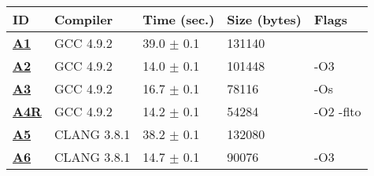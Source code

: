     \begin{tabular}{|l|l|l|l|p{3.2in}|}
     \hline
      \textbf{ID} & \textbf{Compiler} & \textbf{Time (sec.)} & \textbf{Size (bytes)} & \textbf{Flags} \\ 
     \hline
      \textbf{ \href{http://cknowledge.org/repo/web.php?wcid=experiment:28ee633f4192a488\&subpoint=463438f9b5e50e55}{A1} } &  GCC 4.9.2  &  39.0 $\pm$ 0.1  &  131140  & {\small  }\\
     \hline
      \textbf{ \href{http://cknowledge.org/repo/web.php?wcid=experiment:21f631290c7846ee\&subpoint=b3d50b1184e6ebed}{A2} } &  GCC 4.9.2  &  14.0 $\pm$ 0.1  &  101448  & {\small -O3 }\\
     \hline
      \textbf{ \href{http://cknowledge.org/repo/web.php?wcid=experiment:2bdb07edb41aabb0\&subpoint=877f5d27c47b8845}{A3} } &  GCC 4.9.2  &  16.7 $\pm$ 0.1  &  78116  & {\small -Os }\\
     \hline
      \textbf{ \href{http://cknowledge.org/repo/web.php?wcid=experiment:85a9d07941d187e4\&subpoint=c59cc63440c795a7}{A4R} } &  GCC 4.9.2  &  14.2 $\pm$ 0.1  &  54284  & {\small -O2 -flto }\\
     \hline
      \textbf{ \href{http://cknowledge.org/repo/web.php?wcid=experiment:731a468f9643496a\&subpoint=9ca6c418285e121a}{A5} } &  CLANG 3.8.1  &  38.2 $\pm$ 0.1  &  132080  & {\small  }\\
     \hline
      \textbf{ \href{http://cknowledge.org/repo/web.php?wcid=experiment:90dc03e42974d27a\&subpoint=47ebb3b545c2e220}{A6} } &  CLANG 3.8.1  &  14.7 $\pm$ 0.1  &  90076  & {\small -O3 }\\
     \hline
    \end{tabular}    